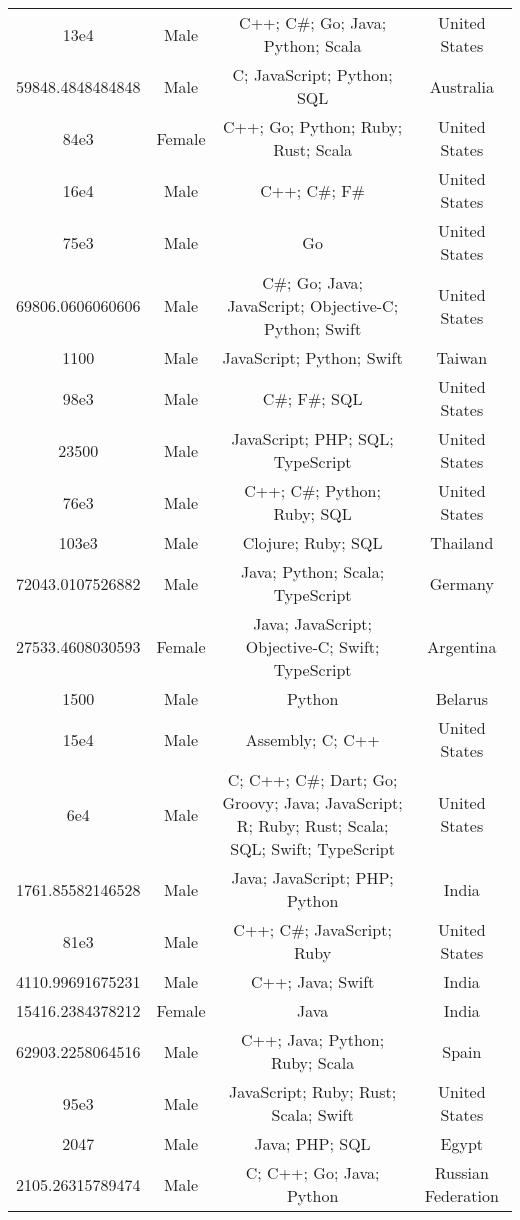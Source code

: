 \begin{center}
\begin{tabular}{ |c|c|c|c| }
13e4  &  Male  &  C++; C\#; Go; Java; Python; Scala  &  United States  \\ 
59848.4848484848  &  Male  &  C; JavaScript; Python; SQL  &  Australia  \\ 
84e3  &  Female  &  C++; Go; Python; Ruby; Rust; Scala  &  United States  \\ 
16e4  &  Male  &  C++; C\#; F\#  &  United States  \\ 
75e3  &  Male  &  Go  &  United States  \\ 
69806.0606060606  &  Male  &  C\#; Go; Java; JavaScript; Objective-C; Python; Swift  &  United States  \\ 
1100  &  Male  &  JavaScript; Python; Swift  &  Taiwan  \\ 
98e3  &  Male  &  C\#; F\#; SQL  &  United States  \\ 
23500  &  Male  &  JavaScript; PHP; SQL; TypeScript  &  United States  \\ 
76e3  &  Male  &  C++; C\#; Python; Ruby; SQL  &  United States  \\ 
103e3  &  Male  &  Clojure; Ruby; SQL  &  Thailand  \\ 
72043.0107526882  &  Male  &  Java; Python; Scala; TypeScript  &  Germany  \\ 
27533.4608030593  &  Female  &  Java; JavaScript; Objective-C; Swift; TypeScript  &  Argentina  \\ 
1500  &  Male  &  Python  &  Belarus  \\ 
15e4  &  Male  &  Assembly; C; C++  &  United States  \\ 
6e4  &  Male  &  C; C++; C\#; Dart; Go; Groovy; Java; JavaScript; R; Ruby; Rust; Scala; SQL; Swift; TypeScript  &  United States  \\ 
1761.85582146528  &  Male  &  Java; JavaScript; PHP; Python  &  India  \\ 
81e3  &  Male  &  C++; C\#; JavaScript; Ruby  &  United States  \\ 
4110.99691675231  &  Male  &  C++; Java; Swift  &  India  \\ 
15416.2384378212  &  Female  &  Java  &  India  \\ 
62903.2258064516  &  Male  &  C++; Java; Python; Ruby; Scala  &  Spain  \\ 
95e3  &  Male  &  JavaScript; Ruby; Rust; Scala; Swift  &  United States  \\ 
2047  &  Male  &  Java; PHP; SQL  &  Egypt  \\ 
2105.26315789474  &  Male  &  C; C++; Go; Java; Python  &  Russian Federation  \\ 

\end{tabular}
\end{center}

